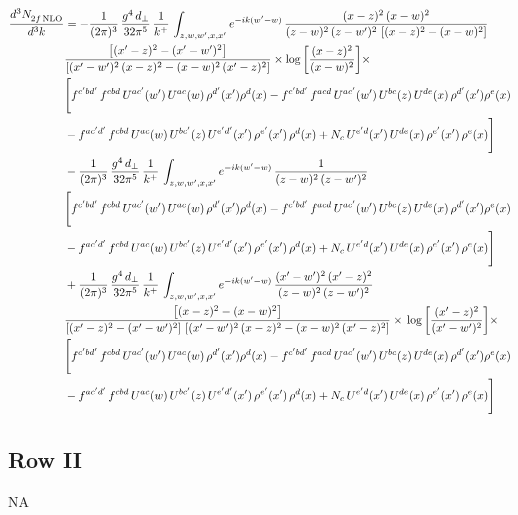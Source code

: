 \documentclass[9pt]{article}
\numberwithin{equation}{section}
\begin{document}
\begin{align}
    \frac{d^{3}N_{2f\,\rm NLO}^{\rm}}{d^{3}k}  & =   - \frac{1}{(2\pi)^{3}}\, \frac{g^{4}\,d_{\perp}}{32\pi^{5}}\,\frac{1}{k^{+}}\,\int_{z,w,w^{\prime},x,x'} e^{-ik(w^{\prime}-w)}\,\frac{(x-z)^{2}\, (x-w)^{2}}{(z-w)^{2}\, (z-w')^{2}\,\left[(x-z)^{2} - (x-w)^{2}\right]}\notag \\ & \frac{\left[(x'-z)^{2}-(x'-w')^{2}\right]}{\left[(x'-w')^{2}\, (x-z)^{2} - (x-w)^{2}\, (x'-z)^{2}\right]}\times \log{\left[\frac{(x-z)^{2}}{(x-w)^{2}}\right]}\times\notag \\ & \Bigg[f^{c'bd'}\,f^{cbd}\, U^{ac'}(w')\,U^{ac}(w)\,\rho^{d'}(x')\rho^{d}(x)- f^{c'bd'}\,f^{acd}\,U^{ac'}(w')\,U^{bc}(z)\,U^{de}(x)\,\rho^{d'}(x')\rho^{e}(x) \notag \\ & -f^{ac'd'}\,f^{cbd}\,U^{ac}(w)\,U^{bc'}(z)\,U^{e'd'}(x')\,\rho^{e'}(x')\,\rho^{d}(x) +N_{c}\,U^{e'd}(x')\,U^{de}(x)\,\rho^{e'}(x')\,\rho^{e}(x)\Bigg]  \notag \\
& - \frac{1}{(2\pi)^{3}}\, \frac{g^{4}\,d_{\perp}}{32\pi^{5}}\,\frac{1}{k^{+}}\,\int_{z,w,w^{\prime},x,x'} e^{-ik(w^{\prime}-w)}\,\frac{1}{(z-w)^{2}\, (z-w')^{2}}\notag \\ & \Bigg[f^{c'bd'}\,f^{cbd}\, U^{ac'}(w')\,U^{ac}(w)\,\rho^{d'}(x')\rho^{d}(x)- f^{c'bd'}\,f^{acd}\,U^{ac'}(w')\,U^{bc}(z)\,U^{de}(x)\,\rho^{d'}(x')\rho^{e}(x) \notag \\ & -f^{ac'd'}\,f^{cbd}\,U^{ac}(w)\,U^{bc'}(z)\,U^{e'd'}(x')\,\rho^{e'}(x')\,\rho^{d}(x) +N_{c}\,U^{e'd}(x')\,U^{de}(x)\,\rho^{e'}(x')\,\rho^{e}(x)\Bigg]  \notag \\
& + \frac{1}{(2\pi)^{3}}\, \frac{g^{4}\,d_{\perp}}{32\pi^{5}}\,\frac{1}{k^{+}}\,\int_{z,w,w^{\prime},x,x'} e^{-ik(w^{\prime}-w)}\,\frac{(x'-w')^{2}\, (x'-z)^{2}}{(z-w)^{2}\, (z-w')^{2}}\notag \\ & \frac{\left[(x-z)^{2} - (x-w)^{2}\right]}{\left[(x'-z)^{2} - (x'-w')^{2}\right]\, \left[(x'-w')^{2}\, (x - z)^{2} - (x-w)^{2}\,(x'-z)^{2}\right]}\times\, \log{\left[\frac{(x'-z)^{2}}{(x'-w')^{2}}\right]}\times \notag \\ &  \Bigg[f^{c'bd'}\,f^{cbd}\, U^{ac'}(w')\,U^{ac}(w)\,\rho^{d'}(x')\rho^{d}(x)- f^{c'bd'}\,f^{acd}\,U^{ac'}(w')\,U^{bc}(z)\,U^{de}(x)\,\rho^{d'}(x')\rho^{e}(x) \notag \\ & -f^{ac'd'}\,f^{cbd}\,U^{ac}(w)\,U^{bc'}(z)\,U^{e'd'}(x')\,\rho^{e'}(x')\,\rho^{d}(x) +N_{c}\,U^{e'd}(x')\,U^{de}(x)\,\rho^{e'}(x')\,\rho^{e}(x)\Bigg]
\end{align}
\subsection{Row II}
\textsc{NA}
\end{document}
